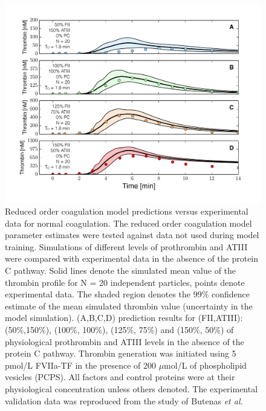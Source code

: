 \documentclass[12pt]{article}
\begin{document}
\begin{figure}
\centering
\includegraphics[width=1.0\textwidth]{./figs/Figure-5-FII_ATIII.pdf}
\caption{Reduced order coagulation model predictions versus experimental data for normal coagulation. 
The reduced order coagulation model parameter estimates were tested against data not used during model training.
Simulations of different levels of prothrombin and ATIII were compared with experimental data in the absence of the protein C pathway. 
Solid lines denote the simulated mean value of the thrombin profile for N = 20 independent particles, points denote experimental data.
The shaded region denotes the 99\% confidence estimate of the mean simulated thrombin value (uncertainty in the model simulation). 
(A,B,C,D) prediction results for (FII,ATIII): (50\%,150\%), (100\%, 100\%), (125\%, 75\%) and (150\%, 50\%) of physiological prothrombin and ATIII levels in the absence of the protein C pathway. 
Thrombin generation was initiated using 5 pmol/L FVIIa-TF in the presence of 200 $\mu$mol/L of phospholipid vesicles (PCPS). 
All factors and control proteins were at their physiological concentration unless others denoted.
The experimental validation data was reproduced from the study of Butenas \textit{et al.} \citep{Butenas:1999aa}}\label{fig-fII_ATIII}
\end{figure}

\clearpage
\end{document}
